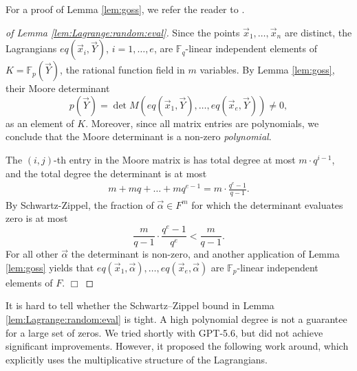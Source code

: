 For a proof of Lemma \ref{lem:goss}, we refer the reader to \cite[Lemma 1.3.3]{Goss96}.


\begin{proof}[of Lemma \ref{lem:Lagrange:random:eval}]
Since the points $\vec x_1,\ldots, \vec x_n$ are distinct, the Lagrangians $eq(\vec x_i,\vec Y)$, $i=1,\ldots,e$, are $\mathbb F_q$-linear independent elements of $K= \mathbb F_p(\vec Y)$, the rational function field in $m$ variables. %
By Lemma \ref{lem:goss}, their Moore determinant 
\[
p(\vec Y) = \det M(eq(\vec x_1, \vec Y),\ldots, eq(\vec x_e, \vec Y))\neq 0,
\]
as an element of $K$.
Moreover, since all matrix entries are polynomials, we conclude that the Moore determinant
is a non-zero \textit{polynomial}. 



%
The $(i,j)$-th entry in the Moore matrix is
has total degree at most $m\cdot q^{i-1}$, and the total degree the determinant is at most
\begin{align*}
m + m q + \ldots + m  q^{e-1} = m \cdot \frac{q^e - 1}{q - 1}.
\end{align*}
By Schwartz-Zippel, the fraction of $\vec\alpha\in F^m$ for which the determinant evaluates zero
is at most
\[
\frac{m}{q-1} \cdot \frac{q^e -1}{q^e} < \frac{m}{q-1}.
\]
For all other $\vec\alpha$ the determinant is non-zero, and another application of Lemma \ref{lem:goss} yields that $eq(\vec x_1,\vec\alpha),\ldots, eq(\vec x_e, \vec \alpha)$ are $\mathbb F_p$-linear independent elements of $F$.
$\Box$
\end{proof}

It is hard to tell whether the Schwartz--Zippel bound in Lemma \ref{lem:Lagrange:random:eval} is tight. 
A high polynomial degree is not a guarantee for a large set of zeros. 
We tried shortly with GPT-5.6, but did not achieve significant improvements. 
However, it proposed the following work around, which explicitly uses the multiplicative structure of the Lagrangians. 

